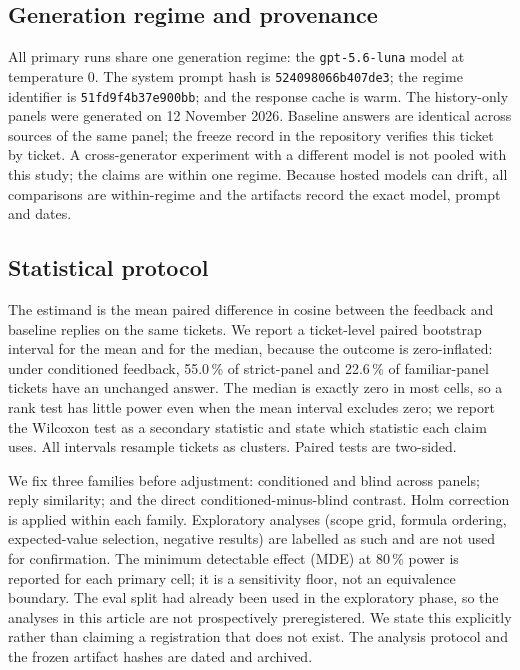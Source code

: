 \documentclass{ieeeaccess}
\begin{document}
\subsection{Generation regime and provenance}
All primary runs share one generation regime: the \texttt{gpt-5.6-luna} model at
temperature 0. The system prompt hash is \texttt{524098066b407de3}; the regime
identifier is \texttt{51fd9f4b37e900bb}; and the response cache is warm. The
history-only panels were generated on 12 November 2026. Baseline answers are identical across sources of the
same panel; the freeze record in the repository verifies this ticket by ticket. A
cross-generator experiment with a different model is not pooled with this study;
the claims are within one regime. Because
hosted models can drift, all comparisons are within-regime and the artifacts record
the exact model, prompt and dates.

\subsection{Statistical protocol}
The estimand is the mean paired difference in cosine between the feedback and
baseline replies on the same tickets. We report a ticket-level paired bootstrap
interval for the mean and for the median, because the outcome is zero-inflated:
under conditioned feedback, 55.0\,\% of strict-panel and 22.6\,\% of familiar-panel
tickets have an unchanged answer. The median is exactly zero in most cells, so a
rank test has little power even when the mean interval excludes zero; we report the
Wilcoxon test as a secondary statistic and state which statistic each claim uses.
All intervals resample tickets as clusters. Paired tests are two-sided.

We fix three families before adjustment: conditioned and blind across
panels; reply similarity; and the direct conditioned-minus-blind contrast. Holm
correction is applied within each family. Exploratory analyses (scope grid, formula
ordering, expected-value selection, negative results) are labelled as such and are
not used for confirmation. The minimum detectable effect (MDE) at 80\,\% power is
reported for each primary cell; it is a sensitivity floor, not an equivalence
boundary. The eval split had already been used in the exploratory phase, so the
analyses in this article are not prospectively preregistered. We state this explicitly
rather than claiming a registration that does not exist. The analysis protocol and
the frozen artifact hashes are dated and archived.
\end{document}
